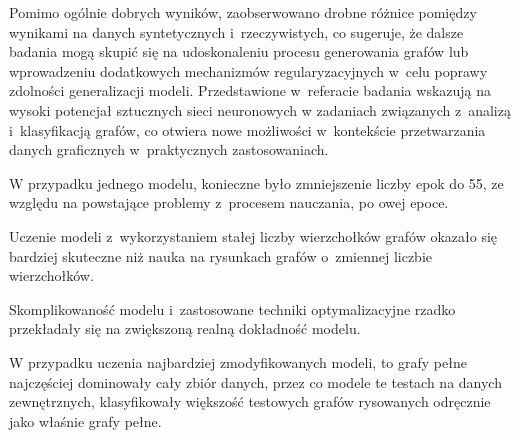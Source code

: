 Pomimo ogólnie dobrych wyników,
zaobserwowano drobne różnice pomiędzy wynikami na danych syntetycznych i~rzeczywistych,
co sugeruje, że dalsze badania mogą skupić się na udoskonaleniu procesu generowania grafów
lub wprowadzeniu dodatkowych mechanizmów regularyzacyjnych w~celu poprawy zdolności generalizacji modeli.
Przedstawione w~referacie badania wskazują na wysoki potencjał sztucznych sieci neuronowych
w zadaniach związanych z~analizą i~klasyfikacją grafów,
co otwiera nowe możliwości w~kontekście przetwarzania danych graficznych w~praktycznych zastosowaniach.

W przypadku jednego modelu, konieczne było zmniejszenie liczby epok do 55,
ze względu na powstające problemy z~procesem nauczania, po owej epoce.

Uczenie modeli z~wykorzystaniem stałej liczby wierzchołków grafów okazało się bardziej skuteczne
niż nauka na rysunkach grafów o~zmiennej liczbie wierzchołków.

Skomplikowaność modelu i~zastosowane techniki optymalizacyjne rzadko przekładały się na zwiększoną realną dokładność modelu.

W przypadku uczenia najbardziej zmodyfikowanych modeli, to grafy pełne najczęściej dominowały cały zbiór danych,
przez co modele te testach na danych zewnętrznych,
klasyfikowały większość testowych grafów rysowanych odręcznie jako właśnie grafy pełne.